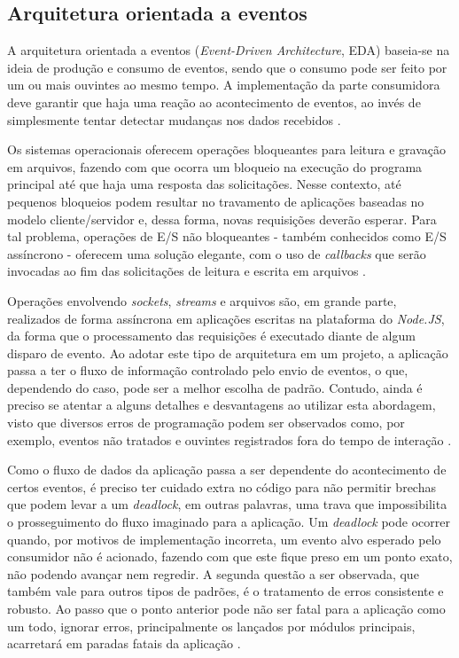 \documentclass[12pt]{article}
\begin{document}
\subsection{Arquitetura orientada a eventos}

A arquitetura orientada a eventos (\textit{Event-Driven Architecture}, EDA) baseia-se na ideia de produção e consumo 
de eventos, sendo que o consumo pode ser feito por um ou mais ouvintes ao mesmo tempo. A implementação da parte consumidora 
deve garantir que haja uma reação ao acontecimento de eventos, ao invés de simplesmente tentar detectar 
mudanças nos dados recebidos \cite[p. 27]{DIOGORESENDE}.

Os sistemas operacionais oferecem operações bloqueantes para leitura e gravação em arquivos, fazendo com que ocorra
um bloqueio na execução do programa principal até que haja uma resposta das solicitações. Nesse contexto, até pequenos
bloqueios podem resultar no travamento de aplicações baseadas no modelo cliente/servidor e, dessa forma, novas requisições
deverão esperar. Para tal problema, operações de E/S não bloqueantes - também conhecidos como E/S assíncrono - oferecem
uma solução elegante, com o uso de \textit{callbacks} que serão invocadas ao fim das solicitações 
de leitura e escrita em arquivos \cite{UDESC}.

Operações envolvendo \textit{sockets}, \textit{streams} e arquivos são, em grande parte, 
realizados de forma assíncrona em aplicações escritas na plataforma do \textit{Node.JS}, da forma que o processamento
das requisições é executado diante de algum disparo de evento. \cite{MFO} Ao adotar este tipo de arquitetura em um projeto, 
a aplicação passa a ter o fluxo de informação controlado pelo envio de eventos, o que, dependendo do caso, pode ser a melhor 
escolha de padrão. Contudo, ainda é preciso se atentar a alguns detalhes e desvantagens ao utilizar esta abordagem,
visto que diversos erros de programação podem ser observados como, por exemplo, eventos não tratados e ouvintes
registrados fora do tempo de interação \cite[p. 28]{DIOGORESENDE}.

Como o fluxo de dados da aplicação passa a ser dependente do acontecimento de certos eventos, é preciso ter cuidado 
extra no código para não permitir brechas que podem levar a um \textit{deadlock},
em outras palavras, uma trava que impossibilita o prosseguimento do fluxo imaginado para a aplicação. Um 
\textit{deadlock} pode ocorrer quando, por motivos de implementação incorreta, um evento alvo esperado pelo
consumidor não é acionado, fazendo com que este fique preso em um ponto exato, não podendo avançar nem regredir.
A segunda questão a ser observada, que também vale para outros tipos de padrões, é o tratamento de erros consistente
e robusto. Ao passo que o ponto anterior pode não ser fatal para a aplicação como um todo, ignorar erros, principalmente
os lançados por módulos principais, acarretará em paradas fatais da aplicação \cite[p. 28]{DIOGORESENDE}.
\end{document}
